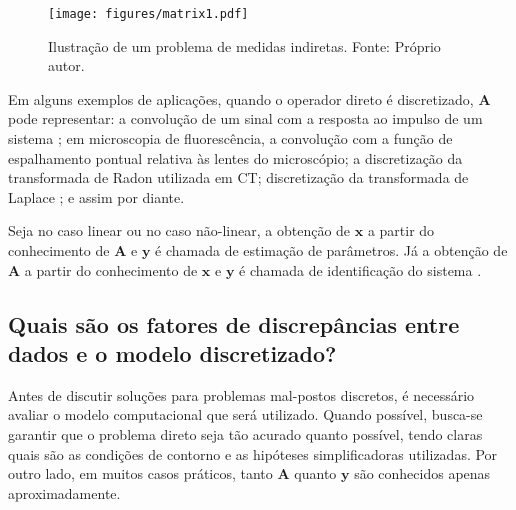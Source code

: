 \begin{figure}[H]
\begin{centering}
\texttt{[image: figures/matrix1.pdf]}
\caption[Ilustração de um problema de medidas indiretas.]{Ilustração de um problema de medidas indiretas. Fonte: Próprio autor.}
\label{fig:my_label}
\end{centering}
\end{figure}

Em alguns exemplos de aplicações, quando o operador direto é discretizado, $\mathbf{A}$ pode representar: a convolução de um sinal com a resposta ao impulso de um sistema \cite[Subseção 2.1]{Mueller2012}; em microscopia de fluorescência, a convolução com a função de espalhamento pontual relativa às lentes do microscópio; a discretização da transformada de Radon \cite[Subseção 2.3]{Mueller2012} utilizada em CT; discretização da transformada de Laplace \cite[Subseção 10.2]{Mueller2012}; e assim por diante.


Seja no caso linear ou no caso não-linear, a obtenção de $\mathbf{x}$ a partir do conhecimento de  $\mathbf{A}$ e $\mathbf{y}$ é chamada de estimação de parâmetros. Já a obtenção de $\mathbf{A}$ a partir do conhecimento de  $\mathbf{x}$ e $\mathbf{y}$ é chamada de identificação do sistema \cite[pág. 2]{aster2019parameter}. 




\subsection{Quais são os fatores de discrepâncias entre dados e o modelo discretizado?}

Antes de discutir soluções para problemas mal-postos discretos, é necessário avaliar o modelo computacional que será utilizado. Quando possível, busca-se garantir que o problema direto seja tão acurado quanto possível, tendo claras quais são as condições de contorno e as hipóteses simplificadoras utilizadas. Por outro lado, em muitos casos práticos, tanto $\mathbf{A}$ quanto $\mathbf{y}$ são conhecidos apenas aproximadamente. 

